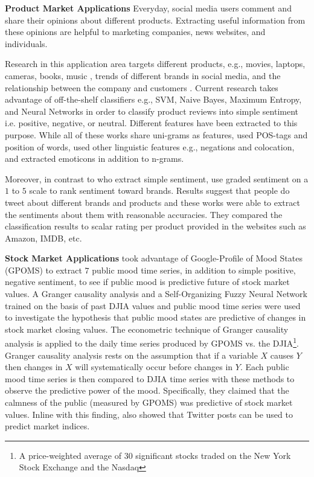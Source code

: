 \documentclass[11pt,a4paper]{article}
\begin{document}
\textbf{Product Market Applications} Everyday, social media users comment and share their opinions about different products. Extracting useful information from these opinions are helpful to marketing companies, news websites, and individuals. 

Research in this application area targets different products, e.g., movies, laptops, cameras, books, music \cite{davelawrence, panglee}, trends of different brands in social media, and the relationship between the company and customers \cite{jensen, ghiassi}. Current research takes advantage of off-the-shelf classifiers e.g., SVM, Naive Bayes, Maximum Entropy, and Neural Networks in order to classify product reviews into simple sentiment i.e. positive, negative, or neutral. Different features have been extracted to this purpose. While all of these works share uni-grams as features, \citet{panglee} used POS-tags and position of words, \citet{davelawrence} used other linguistic features e.g., negations and colocation, and \citet{ghiassi} extracted emoticons in addition to n-grams.

Moreover, in contrast to \cite{panglee, davelawrence} who extract simple sentiment, \cite{jensen, ghiassi} use graded sentiment on a $1$ to $5$ scale to rank sentiment toward brands. Results suggest that people do tweet about different brands and products and these works were able to extract the sentiments about them with reasonable accuracies. They compared the classification results to scalar rating per product provided in the websites such as Amazon, IMDB, etc.

\textbf{Stock Market Applications}
\citet{bollen} took advantage of Google-Profile of Mood States (GPOMS) to extract $7$ public mood time series, in addition to simple positive, negative sentiment, to see if public mood is predictive future of stock market values. A Granger causality analysis and a Self-Organizing Fuzzy Neural Network trained on the basis of past DJIA values and public mood time series were used to investigate the hypothesis that public mood states are predictive of changes in stock market closing values. The econometric technique of Granger causality analysis is applied to the daily time series produced by GPOMS vs. the DJIA\footnote{A price-weighted average of 30 significant stocks traded on the New York Stock Exchange and the Nasdaq}. Granger causality analysis rests on the assumption that if a variable $X$ causes $Y$ then changes in $X$ will systematically occur before changes in $Y$. Each public mood time series is then compared to DJIA time series with these methods to observe the predictive power of the mood. Specifically, they claimed that the calmness of the public (measured by GPOMS) was predictive of stock market values. Inline with this finding, \citet{zhangxue} also showed that Twitter posts can be used to predict market indices. %
\end{document}
